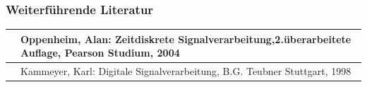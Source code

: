 \subsubsection{Weiterf\"{u}hrende Literatur}

\begin{tabular}{|p{0.7in}|p{5in}|} \hline 
[Oppe04] & Oppenheim, Alan: Zeitdiskrete Signalverarbeitung,2.\newline \"{u}berarbeitete Auflage, Pearson Studium, 2004 \\ \hline 
[Kamm98] & Kammeyer, Karl: Digitale Signalverarbeitung, \newline B.G. Teubner Stuttgart, 1998 \\ \hline 
\end{tabular}